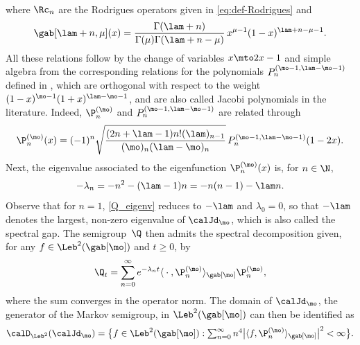 \begin{appendix}
\begin{align}
\end{align}
where $\Rc_n$ are the Rodrigues operators given in \eqref{eq:def-Rodrigues} and
\begin{equation*}
\gab[\lam+n,\mu](x) = \frac{\Gamma(\lam+n)}{\Gamma(\mu)\Gamma(\lam+n-\mu)}\, x^{\mu-1}(1-x)^{\lam+n-\mu-1}.
\end{equation*}
All these relations follow by the change of variables $x \mto 2x-1$ and simple algebra from the corresponding relations for the polynomials $P_n^{(\mo-1,\lam-\mo-1)}$ defined in \cite[Chap.\,4]{Ismail}, which are orthogonal with respect to the weight $(1-x)^{\mo-1}(1+x)^{\lam-\mo-1}$, and are also called Jacobi polynomials in the literature. Indeed, $\P_n^{(\mo)}$ and $P_n^{(\mo-1,\lam-\mo-1)}$ are related through
\begin{equation*}
\P_n^{(\mo)}(x) = (-1)^n \sqrt{\frac{(2n+\lam-1)n!(\lam)_{n-1}}{(\mo)_n(\lam-\mo)_n}}\, P_n^{(\mo-1,\lam-\mo-1)}(1-2x).
\end{equation*}
Next, the eigenvalue associated to the eigenfunction $\P_n^{(\mo)}(x)$ is, for $n \in \N$,
\begin{equation}
\label{Q_eigenv}
-\lambda_n = -n^2-(\lam-1)n= -n(n-1)-\lam n.
\end{equation}
Observe that for $n=1$, \eqref{Q_eigenv} reduces to $-\lam$ and $\lambda_0=0$, so that $-\lam$ denotes the largest, non-zero eigenvalue of $\calJd_\mo$, which is also called the spectral gap. The semigroup~$\Q$ then admits the spectral decomposition given, for any $f \in \Leb^2(\gab[\mo])$ and $t \geq 0$, by
\begin{equation}
\label{Q_sem}
\Q_t = \sum_{n=0}^{\infty} e^{- \lambda_n t} \langle \: \cdot \:, \P^{(\mo)}_n \rangle_{\gab[\mo]} \P^{(\mo)}_n ,
\end{equation}
where the sum converges in the operator norm. The domain of $\calJd_\mo$, the generator of the Markov semigroup, in $\Leb^2(\gab[\mo])$ can then be identified as
\begin{equation*}
\calD_{\Leb^2}(\calJd_\mo) = \bigl\lbrace f \in \Leb^2(\gab[\mo]) : \textstyle\sum_{n=0}^\infty n^4 \bigl|\langle f, \P^{(\mo)}_n \rangle_{\gab[\mo]}\bigr|^2 < \infty \bigr\rbrace.
\end{equation*}

 \label{subsec:variance-decay}


\end{appendix}
